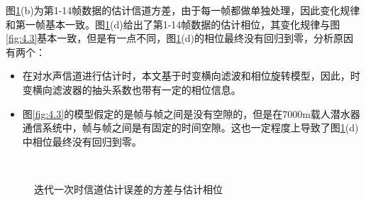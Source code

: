 图\ref{fig:4.8}(b)为第1-14帧数据的估计信道方差，由于每一帧都做单独处理，因此变化规律和第一帧基本一致。图\ref{fig:4.8}(d)给出了第1-14帧数据的估计相位，其变化规律与图\ref{fig:4.3}基本一致，但是有一点不同，图\ref{fig:4.8}(d)的相位最终没有回归到零，分析原因有两个：
\begin{itemize}
    \item
        在对水声信道进行估计时，本文基于时变横向滤波和相位旋转模型，因此，时变横向滤波器的抽头系数也带有一定的相位信息。
    \item
        图\ref{fig:4.3}的模型假定的是帧与帧之间是没有空隙的，但是在7000m载人潜水器通信系统中，帧与帧之间是有固定的时间空隙。这也一定程度上导致了图\ref{fig:4.8}(d)中相位最终没有回归到零。
\end{itemize}
\begin{figure}
    \centering
    \;
    \\
    \;
    \caption{迭代一次时信道估计误差的方差与估计相位}
    \label{fig:4.8}
\end{figure}

